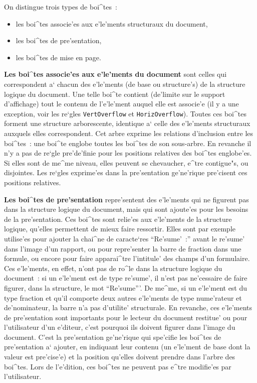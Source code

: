 {On distingue trois types de boi^tes~:

\begin{itemize}
\item
les boi^tes associe'es aux e'le'ments structuraux du document,
\item
les boi^tes de pre'sentation,
\item
les boi^tes de mise en page.
\end{itemize}

{\bf Les boi^tes associe'es aux e'le'ments du document} sont celles qui
correspondent a` chacun des e'le'ments (de base ou structure's) de la structure
logique du document. Une telle boi^te contient (de'limite sur le support
d'affichage) tout le contenu de l'e'le'ment auquel elle est associe'e (il y a
une exception, voir les re`gles {\tt VertOverflow} et {\tt HorizOverflow}).
Toutes ces boi^tes forment une structure arborescente, identique
a` celle des e'le'ments structuraux auxquels elles correspondent.
Cet arbre exprime les relations d'inclusion entre les boi^tes~:
une boi^te englobe toutes les boi^tes de son sous-arbre. En revanche il
n'y a pas de re`gle pre'de'finie pour les positions relatives des boi^tes
englobe'es. Si elles sont de me^me niveau, elles peuvent se chevaucher,
e^tre contigue"s, ou disjointes. Les re`gles exprime'es dans la pre'sentation
ge'ne'rique pre'cisent ces positions relatives.

{\bf Les boi^tes de pre'sentation} repre'sentent des e'le'ments qui ne figurent
pas dans la structure logique du document, mais qui sont ajoute'es pour
les besoins de la pre'sentation. Ces boi^tes sont relie'es aux e'le'ments de la
structure logique, qu'elles permettent de mieux faire ressortir.
Elles sont par exemple utilise'es pour ajouter la chai^ne de
caracte`res ``Re'sume'~:'' avant le re'sume' dans l'image d'un rapport, ou
pour repre'senter la barre de fraction dans une formule, ou encore pour
faire apparai^tre l'intitule' des champs d'un formulaire. Ces
e'le'ments, en effet, n'ont pas de ro^le dans la structure logique du
document~: si un e'le'ment est de type re'sume', il n'est pas ne'cessaire
de faire figurer, dans la structure, le mot ``Re'sume'''. De me^me, si un
e'le'ment est du type fraction et qu'il comporte deux autres e'le'ments
de type nume'rateur et de'nominateur, la barre n'a pas d'utilite'
structurale. En revanche, ces e'le'ments de pre'sentation sont importants
pour le lecteur du document restitue' ou pour l'utilisateur d'un e'diteur,
c'est pourquoi ils doivent figurer dans l'image du document.
C'est la pre'sentation ge'ne'rique qui spe'cifie les boi^tes de pre'sentation
a` ajouter, en indiquant leur contenu (un e'le'ment de base dont la valeur
est pre'cise'e) et la position qu'elles doivent prendre dans l'arbre des
boi^tes. Lors de l'e'dition, ces boi^tes ne peuvent pas e^tre modifie'es
par l'utilisateur.

}

